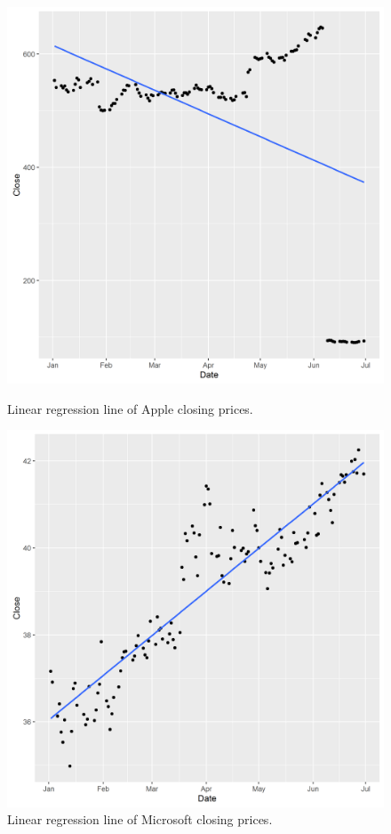 \documentclass[paper=a4, fontsize=11pt]{scrartcl} %
\numberwithin{equation}{section} %
\numberwithin{figure}{section} %
\numberwithin{table}{section} %
\begin{document}
\begin{figure}[!htb]
  \includegraphics[width=\linewidth]{graph/a_reg7.png}
  \caption{Linear regression line of Apple closing prices.}
\endminipage\hfill
{}
  \includegraphics[width=\linewidth]{graph/m_reg7.png}
  \caption{Linear regression line of Microsoft closing prices.}
\endminipage\hfill
\end{figure}
\end{document}
